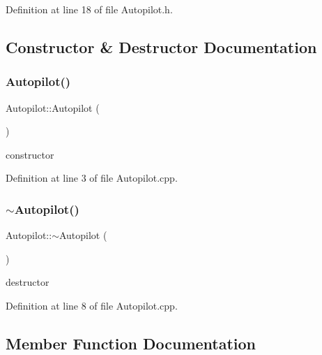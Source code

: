 Definition at line 18 of file Autopilot.\+h.



\subsection{Constructor \& Destructor Documentation}
\mbox{\label{class_autopilot_a7687901ca400c7f1bd0e1a05cfb8e689}} 
\subsubsection{\texorpdfstring{Autopilot()}{Autopilot()}}
{\footnotesize\ttfamily Autopilot\+::\+Autopilot (\begin{DoxyParamCaption}{ }\end{DoxyParamCaption})}



constructor 



Definition at line 3 of file Autopilot.\+cpp.

\mbox{\label{class_autopilot_a5e0044bf8d2f51f800486ab7e5c2534d}} 
\subsubsection{\texorpdfstring{$\sim$\+Autopilot()}{~Autopilot()}}
{\footnotesize\ttfamily Autopilot\+::$\sim$\+Autopilot (\begin{DoxyParamCaption}{ }\end{DoxyParamCaption})}



destructor 



Definition at line 8 of file Autopilot.\+cpp.



\subsection{Member Function Documentation}
\mbox{\label{class_autopilot_aea3535a0804c6ae837c737298eaed687}} 
